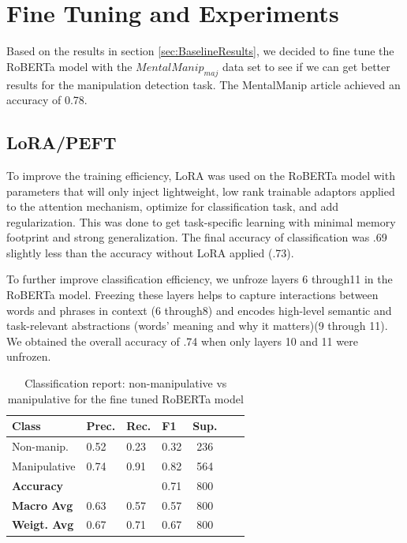 \documentclass[
	letterpaper, %
	12pt, %
	unnumberedsections, %
	twoside, %
]{LTJournalArticle}
\begin{document}
\section{Fine Tuning and Experiments}
Based on the results in section \ref{sec:BaselineResults}, we decided to fine tune the RoBERTa model with the $MentalManip_{maj}$ data set to see if we can get better results for the manipulation detection task. The MentalManip article\cite{MentalManip} achieved an accuracy of 0.78.

\subsection{LoRA/PEFT}
To improve the training efficiency, LoRA was used on the RoBERTa model with parameters that will only inject lightweight, low rank trainable adaptors applied to the attention mechanism, optimize for classification task, and add regularization. This was done to get task-specific learning with minimal memory footprint and strong generalization. The final accuracy of classification was .69 slightly less than the accuracy without LoRA applied (.73).

To further improve classification efficiency, we unfroze layers 6 through11 in the RoBERTa model. Freezing these layers helps to capture interactions between words and phrases in context (6 through8) and encodes high-level semantic and task-relevant abstractions  (words' meaning and why it matters)(9 through 11). We obtained the overall accuracy of .74 when only layers 10 and 11 were unfrozen.

\begin{table}[h!]
	\centering
	\small
	\begin{tabular}{|p{2.2cm}|p{1cm}|p{1cm}|p{1cm}|c|c|c|}
		\hline
		\textbf{Class}      & \textbf{Prec.} & \textbf{Rec.} & \textbf{F1} & \textbf{Sup.} \\

		\hline
		Non-manip.          & 0.52           & 0.23          & 0.32        & 236           \\
		\hline
		Manipulative        & 0.74           & 0.91          & 0.82        & 564           \\
		\hline
		\hline
		\textbf{Accuracy}   &                &               & 0.71        & 800           \\
		\hline
		\textbf{Macro Avg}  & 0.63           & 0.57          & 0.57        & 800           \\
		\hline
		\textbf{Weigt. Avg} & 0.67           & 0.71          & 0.67        & 800           \\
		\hline
	\end{tabular}
	\caption{Classification report: non-manipulative vs manipulative for the fine tuned RoBERTa model}
\end{table}
\end{document}
